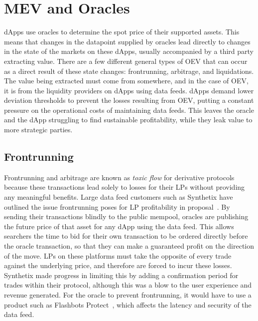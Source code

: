 \documentclass[11pt]{article}
\begin{document}
\section{MEV and Oracles}

dApps use oracles to determine the spot price of their supported assets.
This means that changes in the datapoint supplied by oracles lead directly to changes in the state of the markets on these dApps, usually accompanied by a third party extracting value.
There are a few different general types of OEV that can occur as a direct result of these state changes: frontrunning, arbitrage, and liquidations.
The value being extracted must come from somewhere, and in the case of OEV, it is from the liquidity providers on dApps using data feeds.
dApps demand lower deviation thresholds to prevent the losses resulting from OEV, putting a constant pressure on the operational costs of maintaining data feeds.
This leaves the oracle and the dApp struggling to find sustainable profitability, while they leak value to more strategic parties.

\subsection{Frontrunning}

Frontrunning and arbitrage are known as \textit{toxic flow} for derivative protocols because these transactions lead solely to losses for their LPs without providing any meaningful benefits. 
Large data feed customers such as Synthetix have outlined the issue frontrunning poses for LP profitability in proposal~\cite{sip-37}.
By sending their transactions blindly to the public mempool, oracles are publishing the future price of that asset for any dApp using the data feed.
This allows searchers the time to bid for their own transaction to be ordered directly before the oracle transaction, so that they can make a guaranteed profit on the direction of the move.
LPs on these platforms must take the opposite of every trade against the underlying price, and therefore are forced to incur these losses.
Synthetix made progress in limiting this by adding a confirmation period for trades within their protocol, although this was a blow to the user experience and revenue generated.
For the oracle to prevent frontrunning, it would have to use a product such as Flashbots Protect~\cite{flashbots-protect}, which affects the latency and security of the data feed.
\end{document}
